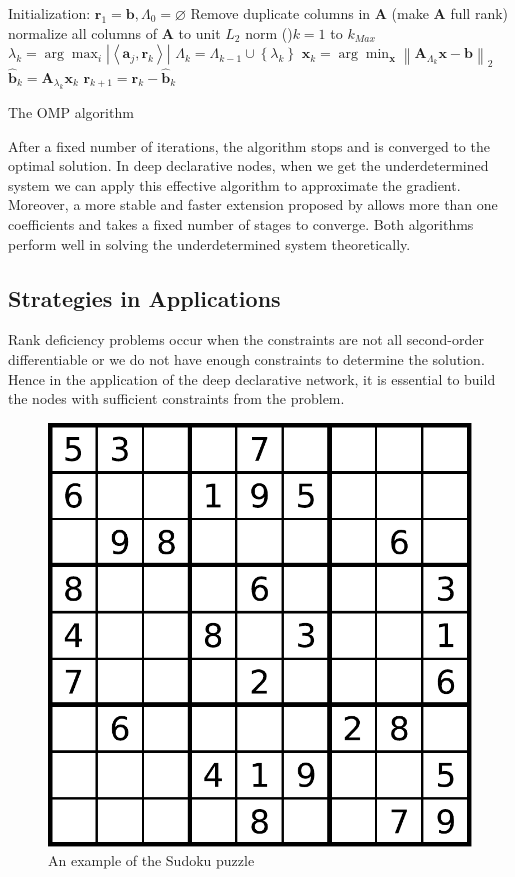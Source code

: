 \begin{algorithm}[H]
    \SetAlgoLined
    Initialization: $\mathbf{r}_{1}=\mathbf{b}, \Lambda_{0}=\varnothing$\;
    Remove duplicate columns in $\mathbf{A}$ (make $\mathbf{A}$ full rank) \;
    normalize all columns of $\mathbf{A}$ to unit $L_2$ norm\;
    \For(){$k=1$ to $k_{Max}$}{
      $\lambda_{k}=\arg \max _{i}\left|\left\langle\mathbf{a}_{j}, \mathbf{r}_{k}\right\rangle\right|$\; 
      $\Lambda_{k}=\Lambda_{k-1} \cup\left\{\lambda_{k}\right\}$\;
      $\mathbf{x}_{k}=\arg \min _{\mathbf{x}}\left\|\mathbf{A}_{\Lambda_{k}} \mathbf{x}-\mathbf{b}\right\|_{2}$\; 
      $\hat{\mathbf{b}}_{k}=\mathbf{A}_{\lambda_{k}} \mathbf{x}_{k}$\; 
      $\mathbf{r}_{k+1}=\mathbf{r}_{k}-\hat{\mathbf{b}}_{k}$
    }
    \caption{The OMP algorithm}
\end{algorithm}
\par After a fixed number of iterations, the algorithm stops and is converged to the optimal solution. In deep declarative nodes, when we get the underdetermined system we can apply this effective algorithm to approximate the gradient. Moreover, a more stable and faster extension proposed by \cite{DD:58} allows more than one coefficients and takes a fixed number of stages to converge. Both algorithms perform well in solving the underdetermined system theoretically. 

\subsection{Strategies in Applications}
Rank deficiency problems occur when the constraints are not all second-order differentiable or we do not have enough constraints to determine the solution. Hence in the application of the deep declarative network, it is essential to build the nodes with sufficient constraints from the problem.
\begin{figure}[t]
    \label{fig:sudoku}
    \centering
    \includegraphics[page=1, width=.4\textwidth]{figs/sudoku.pdf}
    \caption{An example of the Sudoku puzzle~\citep{wiki:sudoku}}
\end{figure}

